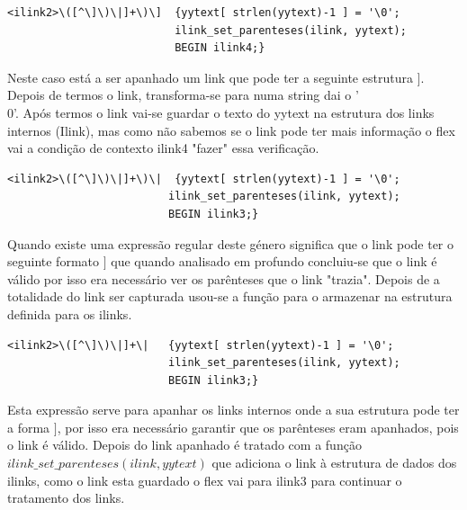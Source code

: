 \documentclass[11pt, a4paper, oneside]{article}
\begin{document}
\begin{verbatim}
<ilink2>\([^\]\)\|]+\)\]  {yytext[ strlen(yytext)-1 ] = '\0';
                          ilink_set_parenteses(ilink, yytext);
                          BEGIN ilink4;}

\end{verbatim}

Neste caso está a ser apanhado um link que pode ter a seguinte estrutura \begin{math}[[Opacity (optics)]]\end{math}. Depois de termos o link,  transforma-se para numa string dai o '\\0'.
Após termos o link vai-se guardar o texto do yytext na estrutura dos links internos (Ilink), mas como não sabemos se o link pode ter mais informação o flex vai a condição de contexto ilink4 "fazer" essa verificação. 

\begin{verbatim}
<ilink2>\([^\]\)\|]+\)\|  {yytext[ strlen(yytext)-1 ] = '\0';
                         ilink_set_parenteses(ilink, yytext);
                         BEGIN ilink3;}
\end{verbatim}
Quando existe uma expressão regular deste género significa que o link pode ter o seguinte formato \begin{math}[[Opacity ((optics))|]]\end{math} que quando analisado em profundo concluiu-se que o link é válido por isso era necessário ver os parênteses que o link "trazia".
Depois de a totalidade do link ser capturada usou-se a função para o armazenar na estrutura definida para os ilinks.

\begin{verbatim}
<ilink2>\([^\]\)\|]+\|   {yytext[ strlen(yytext)-1 ] = '\0';
                         ilink_set_parenteses(ilink, yytext);
                         BEGIN ilink3;}
\end{verbatim}

Esta expressão serve para apanhar os links internos onde a sua estrutura pode ter a forma \begin{math}[[Opacity ((optics|]]\end{math}, por isso era necessário garantir que os parênteses eram apanhados, pois o link é válido. 
Depois do link apanhado é tratado com a função \begin{math} ilink\_set\_parenteses(ilink, yytext)\end{math} que adiciona o link à estrutura de dados dos ilinks, como o link esta guardado o flex vai para ilink3 para continuar o tratamento dos links.
\end{document}
